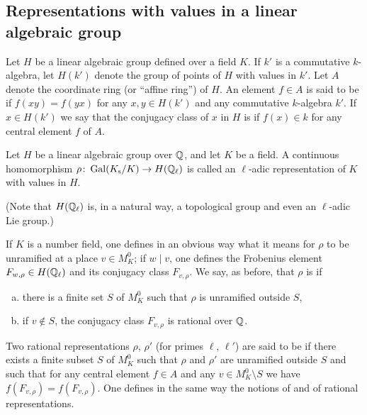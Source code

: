 \subsection{Representations with values in a linear algebraic group}
\label{sec:I_24}
Let $H$ be a linear algebraic group defined over a field $K$. If
$k'$ is a commutative $k$-algebra, let $H(k')$ denote the group of points
of $H$ with values in $k'$. Let $A$ denote the coordinate ring (or
``affine ring'') of $H$. An element $f \in A$ is said to be  if
$f(xy) = f(yx)$ for any $x, y \in H(k')$ and any commutative $k$-algebra
$k'$. If $x \in H(k')$ we say that the conjugacy class of $x$ in $H$ is
 if $f(x) \in k$ for any central element $f$ of $A$.

\begin{mydef}
Let $H$ be a linear algebraic group over $\mathbb{Q}$, and let
$K$ be a field. A continuous homomorphism $\rho \colon \operatorname{Gal}(K_{\mathrm{s}}/K) \to
H(\mathbb{Q}_\ell)$ is called an $\ell$-adic representation of $K$ with values in $H$.
\end{mydef}
(Note that $H(\mathbb{Q}_\ell)$ is, in a natural way, a topological group and even
an $\ell$-adic Lie group.)

If $K$ is a number field, one defines in an obvious way what it
\dpage
means for $\rho$ to be unramified at a place $v \in M_K^0$; if $w\mid v$, one
defines the Frobenius element $F_{w, \rho} \in H(\mathbb{Q}_\ell)$ and its conjugacy
class $F_{v, \rho}$. We say, as before, that $\rho$ is  if
\begin{enumerate}[(a)]
\item\label{ax:rational_ladic_a}
	there is a finite set $S$ of $M_K^0$ such that $\rho$ is unramified
	outside $S$,
\item\label{ax:rational_ladic_b}
	if $v \notin S$, the conjugacy class $F_{v, \rho}$ is rational over $\mathbb{Q}$.
\end{enumerate}
Two rational representations $\rho$, $\rho'$ (for primes $\ell$, $\ell'$) are said to
be  if there exists a finite subset $S$ of $M_K^0$ such that $\rho$
and $\rho'$ are unramified outside $S$ and such that for any central 
element $f \in A$ and any $v \in M_K^0 \setminus S$ we have $f(F_{v, \rho}) =
f(F_{v, \rho})$. One defines in the same way the notions of 
and  of rational representations.


